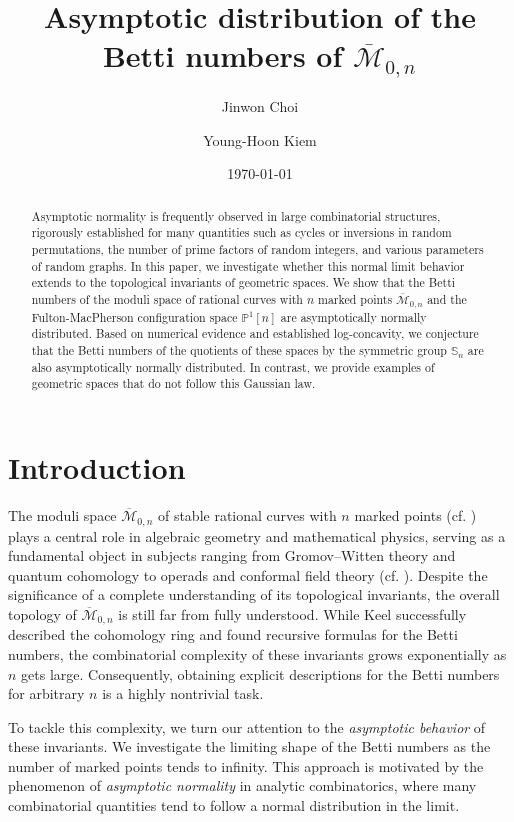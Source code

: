 \documentclass[11pt,letterpaper]{amsart}
\title{Asymptotic distribution of the Betti numbers of $\overline{\mathcal{M}}_{0,n}$}
\author{Jinwon Choi}
\author{Young-Hoon Kiem}
\date{\today}
\numberwithin{equation}{section}
\theoremstyle{definition}
\newcommand{\PP}{\mathbb{P}}
\newcommand{\cal}{\mathcal}
\def\cM{{\cal M}}
\def\mzn{\overline{\cM}_{0,n} }
\def\symS{\mathbb{S}}
\begin{document}
\begin{abstract}
Asymptotic normality is frequently observed in large combinatorial structures, rigorously established for many quantities such as cycles or inversions in random permutations, the number of prime factors of random integers, and various parameters of random graphs. In this paper, we investigate whether this normal limit behavior extends to the topological invariants of geometric spaces. We show that the Betti numbers of the moduli space of rational curves with $n$ marked points $\mzn$ and the Fulton-MacPherson configuration space $\PP^1[n]$ are asymptotically normally distributed. Based on numerical evidence and established log-concavity, we conjecture that the Betti numbers of the quotients of these spaces by the symmetric group $\symS_n$ are also asymptotically normally distributed. In contrast, we provide examples of geometric spaces that do not follow this Gaussian law.
\end{abstract}

\maketitle

\section{Introduction}

The moduli space $\mzn$ of stable rational curves with $n$ marked points (cf. \cite{DM, Knu}) plays a central role in algebraic geometry and mathematical physics, serving as a fundamental object in subjects ranging from Gromov–Witten theory and quantum cohomology to operads and conformal field theory (cf. \cite{Manin}). Despite the significance of a complete understanding of its topological invariants, the overall topology of $\mzn$ is still far from fully understood. While Keel \cite{Keel} successfully described the cohomology ring and found recursive formulas for the Betti numbers, the combinatorial complexity of these invariants grows exponentially as $n$ gets large. Consequently, obtaining explicit descriptions for the Betti numbers for arbitrary $n$ is a highly nontrivial task.

To tackle this complexity, we turn our attention to the \emph{asymptotic behavior} of these invariants.  We investigate the limiting shape of the Betti numbers as the number of marked points tends to infinity. This approach is motivated by the phenomenon of \emph{asymptotic normality} in analytic combinatorics, where many combinatorial quantities tend to follow a normal distribution in the limit.
\end{document}
